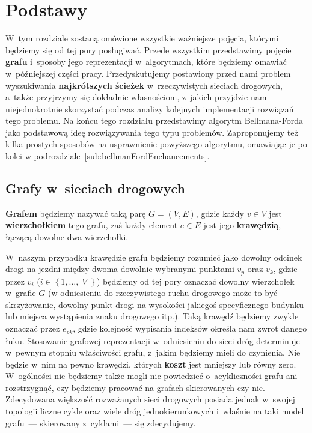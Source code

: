 \chapter{Podstawy}
\thispagestyle{chapterBeginStyle}





W~tym rozdziale zostaną omówione wszystkie ważniejsze pojęcia, którymi będziemy się od tej pory posługiwać.
Przede wszystkim przedstawimy pojęcie \textbf{grafu} i~sposoby jego reprezentacji w~algorytmach, które będziemy omawiać w~późniejszej części pracy.
Przedyskutujemy postawiony przed nami problem wyszukiwania \textbf{najkrótszych ścieżek} w~rzeczywistych sieciach drogowych, a~także przyjrzymy się dokładnie własnościom, z~jakich przyjdzie nam niejednokrotnie skorzystać podczas analizy kolejnych implementacji rozwiązań tego problemu.
Na końcu tego rozdziału przedstawimy algorytm Bellmana-Forda jako podstawową ideę rozwiązywania tego typu problemów.
Zaproponujemy też kilka prostych sposobów na usprawnienie powyższego algorytmu, omawiając je po kolei w podrozdziale~\ref{sub:bellmanFordEnchancements}.




\section{Grafy w~sieciach drogowych}




\textbf{Grafem} będziemy nazywać taką parę $G = \left( V, E \right)$, gdzie każdy $v \in V$ jest \textbf{wierzchołkiem} tego grafu, zaś każdy element $e \in E$ jest jego \textbf{krawędzią}, łączącą dowolne dwa wierzchołki.

W~naszym przypadku krawędzie grafu będziemy rozumieć jako dowolny odcinek drogi na jezdni między dwoma dowolnie wybranymi punktami $v_{p}$ oraz $v_{k}$, gdzie przez $v_{i}$ ($i \in \left\{ 1, \dots, \left| V \right| \right\}$) będziemy od tej pory oznaczać dowolny wierzchołek w~grafie $G$ (w odniesieniu do rzeczywistego ruchu drogowego może to być skrzyżowanie, dowolny punkt drogi na wysokości jakiegoś specyficznego budynku lub miejsca wystąpienia znaku drogowego itp.).
Taką krawędź będziemy zwykle oznaczać przez $e_{pk}$, gdzie kolejność wypisania indeksów określa nam zwrot danego łuku.
Stosowanie grafowej reprezentacji w~odniesieniu do sieci dróg determinuje w~pewnym stopniu właściwości grafu, z~jakim będziemy mieli do czynienia.
Nie będzie w~nim na pewno krawędzi, których \textbf{koszt} jest mniejszy lub równy zero.
W~ogólności nie będziemy także mogli nic powiedzieć o~acykliczności grafu ani rozstrzygnąć, czy będziemy pracować na grafach skierowanych czy nie.
Zdecydowana większość rozważanych sieci drogowych posiada jednak w~swojej topologii liczne cykle oraz wiele dróg jednokierunkowych i~właśnie na taki model grafu~--- skierowany z~cyklami~--- się zdecydujemy.

